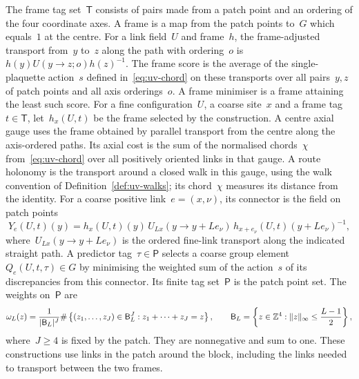 The frame tag set~$\mathsf T$ consists of pairs made from a patch point and an ordering of the four coordinate axes. A frame is a map from the patch points to~$G$ which equals~$1$ at the centre. For a link field~$U$ and frame~$h$, the frame-adjusted transport from~$y$ to~$z$ along the path with ordering~$o$ is~$h(y)U(y\to z;o)h(z)^{-1}$. The frame score is the average of the single-plaquette action~$s$ defined in~\eqref{eq:uv-chord} on these transports over all pairs~$y,z$ of patch points and all axis orderings~$o$. A frame minimiser is a frame attaining the least such score. For a fine configuration~$U$, a coarse site~$x$ and a frame tag~$t\in\mathsf T$, let~$h_x(U,t)$ be the frame selected by the construction. A centre axial gauge uses the frame obtained by parallel transport from the centre along the axis-ordered paths. Its axial cost is the sum of the normalised chords~$\chi$ from~\eqref{eq:uv-chord} over all positively oriented links in that gauge. A route holonomy is the transport around a closed walk in this gauge, using the walk convention of Definition~\ref{def:uv-walks}; its chord~$\chi$ measures its distance from the identity. For a coarse positive link~$e=(x,\nu)$, its connector is the field on patch points
\begin{equation*}
 Y_e(U,t)(y)=h_x(U,t)(y)\,U_{Lx}(y\to y+Le_\nu)\,h_{x+e_\nu}(U,t)(y+Le_\nu)^{-1},
\end{equation*}
where~$U_{Lx}(y\to y+Le_\nu)$ is the ordered fine-link transport along the indicated straight path. A predictor tag~$\tau\in\mathsf P$ selects a coarse group element~$Q_e(U,t,\tau)\in G$ by minimising the weighted sum of the action~$s$ of its discrepancies from this connector. Its finite tag set~$\mathsf P$ is the patch point set. The weights on~$\mathsf P$ are
\begin{equation}\label{eq:uv-predictor-weights}
 \omega_L(z)=\frac{1}{|\mathsf B_L|^J}
   \#\left\{(z_1,\ldots,z_J)\in\mathsf B_L^J:
                     z_1+\cdots+z_J=z\right\},
 \qquad
 \mathsf B_L=\left\{z\in\mathbb Z^4:\|z\|_\infty\le\frac{L-1}{2}\right\},
\end{equation}
where~$J\ge4$ is fixed by the patch. They are nonnegative and sum to one. These constructions use links in the patch around the block, including the links needed to transport between the two frames.

